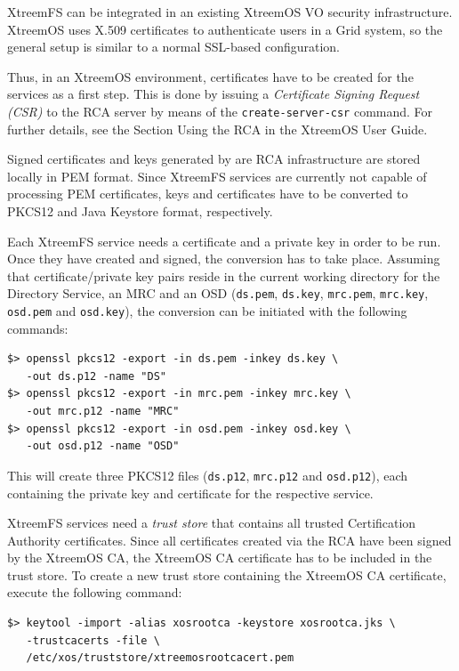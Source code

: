 \documentclass[a4paper,10pt]{book}
\begin{document}
XtreemFS can be integrated in an existing XtreemOS VO security infrastructure. XtreemOS uses X.509 certificates to authenticate users in a Grid system, so the general setup is similar to a normal SSL-based configuration.

Thus, in an XtreemOS environment, certificates have to be created for the services as a first step. This is done by issuing a \textit{Certificate Signing Request (CSR)} to the RCA server by means of the \texttt{create-server-csr} command. For further details, see the Section Using the RCA in the XtreemOS User Guide.

Signed certificates and keys generated by are RCA infrastructure are stored locally in PEM format. Since XtreemFS services are currently not capable of processing PEM certificates, keys and certificates have to be converted to PKCS12 and Java Keystore format, respectively.

Each XtreemFS service needs a certificate and a private key in order to be run. Once they have created and signed, the conversion has to take place. Assuming that certificate/private key pairs reside in the current working directory for the Directory Service, an MRC and an OSD (\texttt{ds.pem}, \texttt{ds.key}, \texttt{mrc.pem}, \texttt{mrc.key}, \texttt{osd.pem} and \texttt{osd.key}), the conversion can be initiated with the following commands:


\begin{verbatim}
$> openssl pkcs12 -export -in ds.pem -inkey ds.key \
   -out ds.p12 -name "DS"
$> openssl pkcs12 -export -in mrc.pem -inkey mrc.key \
   -out mrc.p12 -name "MRC"
$> openssl pkcs12 -export -in osd.pem -inkey osd.key \
   -out osd.p12 -name "OSD"
\end{verbatim}

This will create three PKCS12 files (\texttt{ds.p12}, \texttt{mrc.p12} and \texttt{osd.p12}), each containing the private key and certificate for the respective service.

XtreemFS services need a \textit{trust store} that contains all trusted Certification Authority certificates. Since all certificates created via the RCA have been signed by the XtreemOS CA, the XtreemOS CA certificate has to be included in the trust store. To create a new trust store containing the XtreemOS CA certificate, execute the following command:


\begin{verbatim}
$> keytool -import -alias xosrootca -keystore xosrootca.jks \
   -trustcacerts -file \
   /etc/xos/truststore/xtreemosrootcacert.pem
\end{verbatim}
\end{document}
